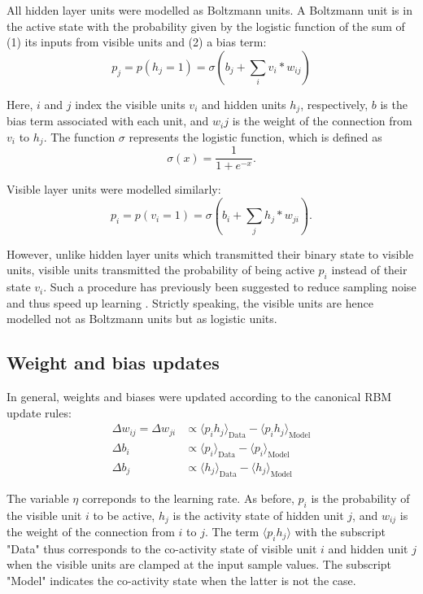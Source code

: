 \documentclass[11pt]{article}
\begin{document}
All hidden layer units were modelled as Boltzmann units. A Boltzmann
unit is in the active state with the probability given by the logistic
function of the sum of (1) its inputs from visible units and (2) a
bias term:
\begin{equation}
  p_j = p(h_j = 1) = \sigma(b_j + \sum_i v_i * w_{ij})
\end{equation}

Here, $i$ and $j$ index the visible units $v_i$ and hidden units $h_j$,
respectively, $b$ is the bias term associated with each unit, and
$w_ij$ is the weight of the connection from $v_i$ to $h_j$. The function
$\sigma$ represents the logistic function, which is defined as
\begin{equation}
  \sigma(x) = \frac{1}{1 + e^{-x}}.
\end{equation}

Visible layer units were modelled similarly:
\begin{equation}
  p_i = p(v_i = 1) = \sigma(b_i + \sum_j h_j * w_{ji}).
\end{equation}

However, unlike hidden layer units which transmitted their binary
state to visible units, visible units transmitted the probability of
being active $p_i$ instead of their state $v_i$. Such a procedure has
previously been suggested to reduce sampling noise and thus speed up
learning \cite{Hinton2012}. Strictly speaking, the visible units are
hence modelled not as Boltzmann units but as logistic units.

\subsection{Weight and bias updates}

In general, weights and biases were updated according to the canonical RBM update rules:
\begin{align}
  \label{eq:rbm_update_equations}
  \Delta w_{ij} = \Delta w_{ji} &\propto \langle p_{i}h_{j} \rangle_{\text{Data}} - \langle p_{i}h_{j} \rangle_{\text{Model}} \\
  \Delta b_{i}                  &\propto \langle p_{i}      \rangle_{\text{Data}} - \langle p_{i}      \rangle_{\text{Model}} \\
  \Delta b_{j}                  &\propto \langle h_{j}      \rangle_{\text{Data}} - \langle h_{j}      \rangle_{\text{Model}}
\end{align}

The variable $\eta$ correponds to the learning rate. As before, $p_i$ is
the probability of the visible unit $i$ to be active, $h_j$ is the
activity state of hidden unit $j$, and $w_{ij}$ is the weight of the
connection from $i$ to $j$. The term $\langle p_{i}h_{j} \rangle$ with the
subscript "Data" thus corresponds to the co-activity state of visible
unit $i$ and hidden unit $j$ when the visible units are clamped at the
input sample values. The subscript "Model" indicates the co-activity
state when the latter is not the case.
\end{document}
